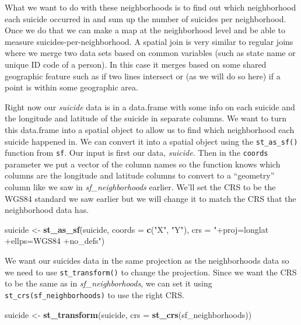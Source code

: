 \documentclass[
  12pt,
]{book}
\newenvironment{Shaded}{\begin{snugshade}}{\end{snugshade}}
\newcommand{\DataTypeTok}[1]{\textcolor[rgb]{0.13,0.29,0.53}{#1}}
\newcommand{\KeywordTok}[1]{\textcolor[rgb]{0.13,0.29,0.53}{\textbf{#1}}}
\newcommand{\NormalTok}[1]{#1}
\newcommand{\StringTok}[1]{\textcolor[rgb]{0.31,0.60,0.02}{#1}}
\begin{document}
What we want to do with these neighborhoods is to find out which neighborhood each suicide occurred in and sum up the number of suicides per neighborhood. Once we do that we can make a map at the neighborhood level and be able to measure suicides-per-neighborhood. A spatial join is very similar to regular joins where we merge two data sets based on common variables (such as state name or unique ID code of a person). In this case it merges based on some shared geographic feature such as if two lines intersect or (as we will do so here) if a point is within some geographic area.

Right now our \emph{suicide} data is in a data.frame with some info on each suicide and the longitude and latitude of the suicide in separate columns. We want to turn this data.frame into a spatial object to allow us to find which neighborhood each suicide happened in. We can convert it into a spatial object using the \texttt{st\_as\_sf()} function from \texttt{sf}. Our input is first our data, \emph{suicide.} Then in the \texttt{coords} parameter we put a vector of the column names so the function knows which columns are the longitude and latitude columns to convert to a ``geometry'' column like we saw in \emph{sf\_neighborhoods} earlier. We'll set the CRS to be the WGS84 standard we saw earlier but we will change it to match the CRS that the neighborhood data has.

\begin{Shaded}
\begin{Highlighting}[]
\NormalTok{suicide <{-}}\StringTok{ }\KeywordTok{st\_as\_sf}\NormalTok{(suicide, }
                    \DataTypeTok{coords =} \KeywordTok{c}\NormalTok{(}\StringTok{"X"}\NormalTok{, }\StringTok{"Y"}\NormalTok{),}
                    \DataTypeTok{crs =} \StringTok{"+proj=longlat +ellps=WGS84 +no\_defs"}\NormalTok{)}
\end{Highlighting}
\end{Shaded}

We want our suicides data in the same projection as the neighborhoods data so we need to use \texttt{st\_transform()} to change the projection. Since we want the CRS to be the same as in \emph{sf\_neighborhoods}, we can set it using \texttt{st\_crs(sf\_neighborhoods)} to use the right CRS.

\begin{Shaded}
\begin{Highlighting}[]
\NormalTok{suicide <{-}}\StringTok{ }\KeywordTok{st\_transform}\NormalTok{(suicide, }
                        \DataTypeTok{crs =} \KeywordTok{st\_crs}\NormalTok{(sf\_neighborhoods))}
\end{Highlighting}
\end{Shaded}
\end{document}

